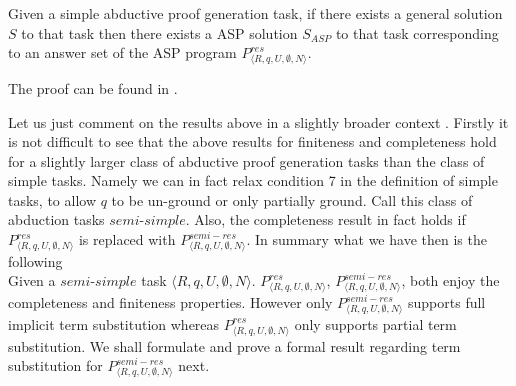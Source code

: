 
\begin{theorem}[Completeness]\label{thm:completeness}
  Given a simple abductive proof generation task, if there exists a general solution $S$ to that task then there
  exists a ASP solution $S_{ASP}$ to that task corresponding to an answer set of the ASP program $P_{\langle R,q,U,\emptyset,N\rangle}^{res}$.
\end{theorem}

The proof can be found in \cite{extended_version}.

Let us just comment on the results above in a slightly broader context . Firstly it is not difficult to see that the above results for finiteness and completeness hold for a slightly larger class of abductive proof generation tasks than the class of simple tasks. Namely we can in fact relax condition 7 in the definition of simple tasks, to allow $q$ to be un-ground or only partially ground. Call this class of abduction tasks $semi$-$simple$.  Also, the completeness result in fact holds if $P_{\langle R,q,U,\emptyset,N\rangle}^{res}$ is replaced with $P_{\langle R,q,U,\emptyset,N\rangle}^{semi-res}$. In summary what we have then is the following\\
Given a $\textit{semi-simple}$ task $\langle R,q,U,\emptyset,N\rangle$. $P_{\langle R,q,U,\emptyset,N\rangle}^{res}$, $P_{\langle R,q,U,\emptyset,N\rangle}^{semi-res}$, both enjoy the completeness and finiteness properties. However only $P_{\langle R,q,U,\emptyset,N\rangle}^{semi-res}$ supports full implicit term substitution whereas $P_{\langle R,q,U,\emptyset,N\rangle}^{res}$ only supports partial term substitution. We shall formulate and prove a formal result regarding term substitution for $P_{\langle R,q,U,\emptyset,N\rangle}^{semi-res}$ next.    

